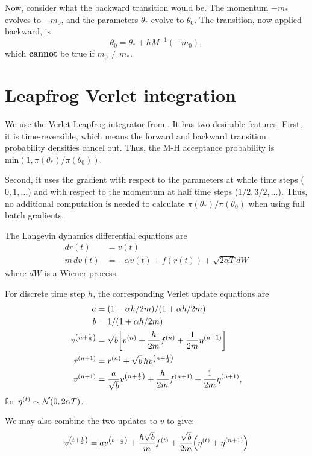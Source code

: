 \documentclass{article}
\begin{document}
Now, consider what the backward transition would be. The momentum \(-m_*\)
evolves to \(-m_0\), and the parameters \(\theta_*\) evolve to \(\theta_0\). The
transition, now applied backward, is
\begin{equation}
  \theta_0 = \theta_* + h M^{-1} (-m_0),
\end{equation}
which \textbf{cannot} be true if \(m_0 \ne m_*\).

\section{Leapfrog Verlet integration}
\label{sec:org7376eca}
We use the Verlet Leapfrog integrator from \cite{complete-verlet}. It has two
desirable features. First, it is time-reversible, which means the forward and
backward transition probability densities cancel out. Thus, the M-H acceptance
probability is \(\text{min}(1, \pi(\theta_*) / \pi(\theta_0))\).

Second, it uses the gradient with respect to the parameters at
whole time steps (\(0, 1, \dots\)) and with respect to the momentum at half time
steps (\(1/2, 3/2, \dots\)). Thus, no additional computation is needed to
calculate \(\pi(\theta_*) / \pi(\theta_0)\) when using full batch gradients.

The Langevin dynamics differential equations are
\begin{align}
  dr(t) &= v(t) \\
  m\,dv(t) &= -\alpha v(t) + f(r(t)) + \sqrt{2\alpha T}dW
\end{align}
where \(dW\) is a Wiener process.

For discrete time step \(h\), the corresponding Verlet update equations are 
\begin{align}
a &= (1 - \alpha h / 2m) / (1 + \alpha h / 2m) \\
b &= 1 / (1 + \alpha h / 2m) \\
v^{{\left( n+\frac{1}{2} \right)}} &= \sqrt{b} {\left[ v^{{\left( n \right)}} + \frac{h}{2m}f^{{\left( n \right)}} + \frac{1}{2m}\eta^{{\left( n+1 \right)}} \right]} \\
r^{{\left( n+1 \right)}} &= r^{{\left( n \right)}}+ \sqrt{b}\, h v^{{\left( n+\frac{1}{2} \right)}} \\
v^{{\left( n+1 \right)}} &= \frac{a}{\sqrt{b}}v^{{\left( n+\frac{1}{2} \right)}} + \frac{h}{2m}f^{{\left( n+1 \right)}} + \frac{1}{2m}\eta^{{\left( n+1 \right)}},\\
\end{align}
for \(\eta^{{\left( t \right)}} \sim \mathcal{N}{\left( 0, 2\alpha T \right)}\).

We may also combine the two updates to \(v\) to give:
\begin{equation}
v^{{\left( t+\frac{1}{2} \right)}} = a v^{{\left( t-\frac{1}{2} \right)}} + \frac{h\sqrt{b}}{m}f^{{\left( t \right)}} + \frac{\sqrt{b}}{2m}{\left( \eta^{{\left( t \right)}} + \eta^{{\left( n+1 \right)}} \right)}
\end{equation}
\end{document}
